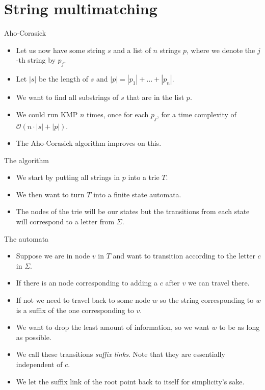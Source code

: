 \documentclass{beamer}
\begin{document}
\section*{String multimatching}

\begin{frame}[plain]{Aho-Corasick}
	\begin{itemize}
        \item Let us now have some string $s$ and a list of $n$ strings $p$, where we denote the $j$-th string by $p_j$.
        \item Let $|s|$ be the length of $s$ and $|p| = |p_1| + \dots + |p_n|$.
        \item We want to find all substrings of $s$ that are in the list $p$.
        \item We could run KMP $n$ times, once for each $p_j$, for a time complexity of $\mathcal{O}(n \cdot |s| + |p|)$.
        \item The Aho-Corasick algorithm improves on this.
    \end{itemize}
\end{frame}

\begin{frame}[plain]{The algorithm}
	\begin{itemize}
        \item We start by putting all strings in $p$ into a trie $T$.
        \item We then want to turn $T$ into a finite state automata.
        \item The nodes of the trie will be our states but the transitions from each state will correspond to a letter from $\Sigma$.
    \end{itemize}
\end{frame}

\begin{frame}[plain]{The automata}
	\begin{itemize}
        \item Suppose we are in node $v$ in $T$ and want to transition according to the letter $c$ in $\Sigma$.
        \item If there is an node corresponding to adding a $c$ after $v$ we can travel there.
        \item If not we need to travel back to some node $w$ so the string corresponding to $w$ is a suffix of the one corresponding to $v$.
        \item We want to drop the least amount of information, so we want $w$ to be as long as possible.
        \item We call these transitions \emph{suffix links}. Note that they are essentially independent of $c$.
        \item We let the suffix link of the root point back to itself for simplicity's sake.
    \end{itemize}
\end{frame}
\end{document}
